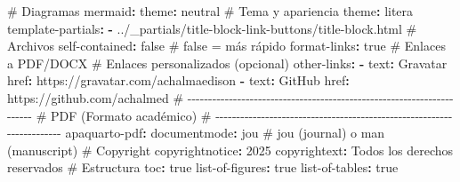 \documentclass[
  doc,
  floatsintext,
  longtable,
  a4paper,
  nolmodern,
  notxfonts,
  notimes,
  12pt,
  colorlinks=true,linkcolor=blue,citecolor=blue,urlcolor=blue]{apa7}
\newenvironment{Shaded}{\begin{snugshade}}{\end{snugshade}}
\newcommand{\AttributeTok}[1]{\textcolor[rgb]{0.40,0.45,0.13}{#1}}
\newcommand{\CharTok}[1]{\textcolor[rgb]{0.13,0.47,0.30}{#1}}
\newcommand{\CommentTok}[1]{\textcolor[rgb]{0.37,0.37,0.37}{#1}}
\newcommand{\DecValTok}[1]{\textcolor[rgb]{0.68,0.00,0.00}{#1}}
\newcommand{\FunctionTok}[1]{\textcolor[rgb]{0.28,0.35,0.67}{#1}}
\newcommand{\KeywordTok}[1]{\textcolor[rgb]{0.00,0.23,0.31}{\textbf{#1}}}
\begin{document}
\begin{Shaded}
\begin{Highlighting}[]
\AttributeTok{    }
\CommentTok{    \# Diagramas}
\AttributeTok{    }\FunctionTok{mermaid}\KeywordTok{:}
\AttributeTok{      }\FunctionTok{theme}\KeywordTok{:}\AttributeTok{ neutral}
\AttributeTok{    }
\CommentTok{    \# Tema y apariencia}
\AttributeTok{    }\FunctionTok{theme}\KeywordTok{:}\AttributeTok{ litera}
\AttributeTok{    }\FunctionTok{template{-}partials}\KeywordTok{:}
\AttributeTok{      }\KeywordTok{{-}}\AttributeTok{ ../\_partials/title{-}block{-}link{-}buttons/title{-}block.html}
\AttributeTok{    }
\CommentTok{    \# Archivos}
\AttributeTok{    }\FunctionTok{self{-}contained}\KeywordTok{:}\AttributeTok{ }\CharTok{false}\CommentTok{            \# false = más rápido}
\AttributeTok{    }\FunctionTok{format{-}links}\KeywordTok{:}\AttributeTok{ }\CharTok{true}\CommentTok{               \# Enlaces a PDF/DOCX}
\AttributeTok{    }
\CommentTok{    \# Enlaces personalizados (opcional)}
\AttributeTok{    }\FunctionTok{other{-}links}\KeywordTok{:}
\AttributeTok{      }\KeywordTok{{-}}\AttributeTok{ }\FunctionTok{text}\KeywordTok{:}\AttributeTok{ Gravatar}
\AttributeTok{        }\FunctionTok{href}\KeywordTok{:}\AttributeTok{ https://gravatar.com/achalmaedison}
\AttributeTok{      }\KeywordTok{{-}}\AttributeTok{ }\FunctionTok{text}\KeywordTok{:}\AttributeTok{ GitHub}
\AttributeTok{        }\FunctionTok{href}\KeywordTok{:}\AttributeTok{ https://github.com/achalmed}
\AttributeTok{    }
\CommentTok{  \# {-}{-}{-}{-}{-}{-}{-}{-}{-}{-}{-}{-}{-}{-}{-}{-}{-}{-}{-}{-}{-}{-}{-}{-}{-}{-}{-}{-}{-}{-}{-}{-}{-}{-}{-}{-}{-}{-}{-}{-}{-}{-}{-}{-}{-}{-}{-}{-}{-}{-}{-}{-}{-}{-}{-}{-}{-}{-}{-}{-}{-}{-}{-}{-}{-}{-}{-}{-}{-}{-}}
\CommentTok{  \# PDF (Formato académico)}
\CommentTok{  \# {-}{-}{-}{-}{-}{-}{-}{-}{-}{-}{-}{-}{-}{-}{-}{-}{-}{-}{-}{-}{-}{-}{-}{-}{-}{-}{-}{-}{-}{-}{-}{-}{-}{-}{-}{-}{-}{-}{-}{-}{-}{-}{-}{-}{-}{-}{-}{-}{-}{-}{-}{-}{-}{-}{-}{-}{-}{-}{-}{-}{-}{-}{-}{-}{-}{-}{-}{-}{-}{-}}
\AttributeTok{  }\FunctionTok{apaquarto{-}pdf}\KeywordTok{:}
\AttributeTok{    }\FunctionTok{documentmode}\KeywordTok{:}\AttributeTok{ jou}\CommentTok{                \# jou (journal) o man (manuscript)}
\AttributeTok{    }
\CommentTok{    \# Copyright}
\AttributeTok{    }\FunctionTok{copyrightnotice}\KeywordTok{:}\AttributeTok{ }\DecValTok{2025}
\AttributeTok{    }\FunctionTok{copyrightext}\KeywordTok{:}\AttributeTok{ Todos los derechos reservados}
\AttributeTok{    }
\CommentTok{    \# Estructura}
\AttributeTok{    }\FunctionTok{toc}\KeywordTok{:}\AttributeTok{ }\CharTok{true}
\AttributeTok{    }\FunctionTok{list{-}of{-}figures}\KeywordTok{:}\AttributeTok{ }\CharTok{true}
\AttributeTok{    }\FunctionTok{list{-}of{-}tables}\KeywordTok{:}\AttributeTok{ }\CharTok{true}

\end{Highlighting}
\end{Shaded}
\end{document}
